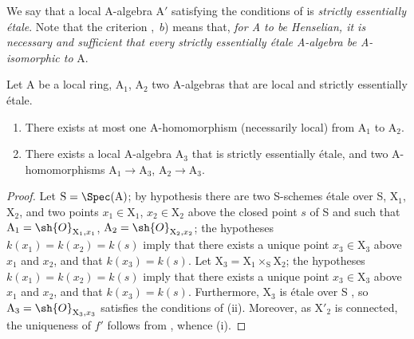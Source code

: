 We say that a local A-algebra $\mathrm{A}'$ satisfying the conditions of  is \emph{strictly essentially \'{e}tale}.
Note that the criterion ,~$b$) means that, \emph{for A to be Henselian, it is necessary and sufficient that every strictly essentially \'{e}tale A-algebra be A-isomorphic to} A.

\begin{lemma}[18.6.3]
\label{IV.18.6.3}
Let $\mathrm{A}$ be a local ring, $\mathrm{A}_1$, $\mathrm{A}_2$ two A-algebras that are local and strictly essentially \'{e}tale.
\begin{enumerate}[label=\emph{\roman*)}]
  \item There exists at most one A-homomorphism (necessarily local) from $\mathrm{A}_1$ to $\mathrm{A}_2$.
  \item There exists a local A-algebra $\mathrm{A}_3$ that is strictly essentially \'{e}tale, and two A-homomorphisms $\mathrm{A}_1\to\mathrm{A}_3$, $\mathrm{A}_2\to\mathrm{A}_3$.
\end{enumerate}
\end{lemma}

\begin{proof}
Let $\mathrm{S}=\Spec(\mathrm{A})$;
by hypothesis there are two S-schemes \'{e}tale over S, $\mathrm{X}_1$, $\mathrm{X}_2$, and two points $x_1\in\mathrm{X}_1$, $x_2\in\mathrm{X}_2$ above the closed point $s$ of S and such that $\mathrm{A}_1=\sh{O}_{\mathrm{X}_1,x_1}$, $\mathrm{A}_2=\sh{O}_{\mathrm{X}_2,x_2}$;
the hypotheses $k(x_1)=k(x_2)=k(s)$  imply that there exists a unique point $x_3\in\mathrm{X}_3$ above $x_1$ and $x_2$, and that $k(x_3)=k(s)$.
Let $\mathrm{X}_3=\mathrm{X}_1\times_{\mathrm{S}}\mathrm{X}_2$;
the hypotheses $k(x_1)=k(x_2)=k(s)$  imply that there exists a unique point $x_3\in\mathrm{X}_3$ above $x_1$ and $x_2$, and that $k(x_3)=k(s)$.
Furthermore, $\mathrm{X}_3$ is \'{e}tale over S , so $\mathrm{A}_3=\sh{O}_{\mathrm{X}_3,x_3}$ satisfies the conditions of (ii).
Moreover,
as $\mathrm{X}'_2$ is connected, the uniqueness of $f'$ follows from , whence (i).
\end{proof}

